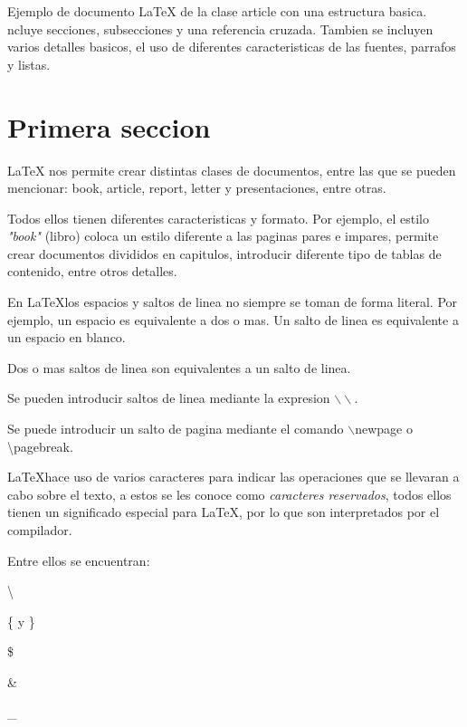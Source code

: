 \documentclass[letterpaper,11pt]{article}
\begin{document}
Ejemplo de documento \LaTeX{} de la clase {\ttfamily article} con una estructura basica. 
ncluye secciones, subsecciones y una referencia cruzada. Tambien se incluyen varios 
detalles basicos, el uso de diferentes caracteristicas de las fuentes, parrafos y listas.

\section{Primera seccion}\label{primera}

\LaTeX{} nos permite crear distintas clases de documentos, entre las que se pueden mencionar: 
book, article, report, letter y presentaciones, entre otras.

Todos ellos tienen diferentes caracteristicas y formato. Por ejemplo, el estilo \textit{"book"} 
(libro) coloca un estilo diferente a las paginas pares e impares, permite crear documentos 
divididos en capitulos, introducir diferente  tipo de tablas de contenido, entre otros detalles.





En \LaTeX los espacios y saltos de linea no siempre se toman de forma literal.
Por ejemplo, un espacio        es      equivalente a      dos o mas. 
Un salto de linea es equivalente a un espacio en blanco.

Dos o mas saltos de linea son equivalentes a un salto de linea.

Se pueden introducir saltos de linea mediante la expresion $\backslash\backslash$.

Se puede introducir un salto de pagina mediante el comando $\backslash$newpage o \textbackslash pagebreak.


\LaTeX hace uso de varios caracteres para indicar las operaciones que se llevaran a cabo sobre el texto, a estos se les conoce como \emph{caracteres reservados}, todos ellos tienen un significado especial para \LaTeX, por lo que son interpretados por el compilador.

Entre ellos se encuentran:

\textbackslash

\{ y \}

\$

\&

\_
\end{document}
